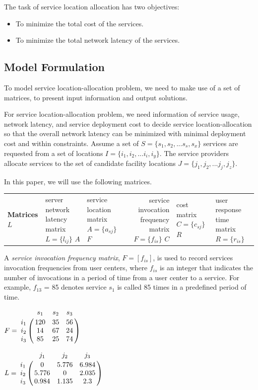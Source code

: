 \documentclass{llncs}
\let\bbordermatrix\bordermatrix
\begin{document}
The task of service location allocation has two objectives:
\begin{itemize}
	\item To minimize the total cost of the services.
	\item To minimize the total network latency of the services.
\end{itemize}


\subsection{Model Formulation}
\label{sec:model}
To model service location-allocation problem, we need to make use of a set of matrices, to present input information and output solutions. 

For service location-allocation problem, we need information of service usage, network latency, and service deployment cost to decide service location-allocation so that the overall network latency can be minimized with minimal deployment cost and within constraints.
Assume a set of $S = \{ s_{1}, s_{2}, ...s_{s}, s_{x}\}$ services are
requested from a set of locations $I = \{ i_{1}, i_{2}, ...i_{i}, i_{y} \}$. 
The service providers allocate services to the set of candidate facility locations $J = \{ j_{1}, j_{2}, ...j_{j}, j_{z} \}$.


In this paper, we will use the following matrices.
\begin{center}
{
	\begin{tabular}{l*{2}{l}r}
		\hline
		\textbf{Matrices} \cr
		$L$ & server network latency matrix $L = \{l_{ij}\}$ \cr
		$A$ & service location matrix $A = \{a_{sj}\}$ \cr
		$F$ & service invocation frequency matrix $F = \{f_{is}\}$ \cr
		$C$ & cost matrix $C = \{c_{sj}\}$ \cr
		$R$ & user response time matrix $R = \{r_{is}\}$ \cr
		\hline
	\end{tabular}
}
\end{center}
A \emph{service invocation frequency matrix}, $F= [f_{is}]$, is used to record services invocation frequencies from user centers, 
where $f_{is}$ is an integer that indicates the number of invocations in a period of time from a user center to a service. 
For example, $f_{13}$ = 85 denotes service $s_{1}$ is called 85 times in a predefined period of time.

\parbox{.45\linewidth}{
{\centering
$
F = \bbordermatrix{~ & s_{1} & s_{2} & s_{3}  \cr
					i_{1}	&120 &35 &56	\cr
					i_{2}	&14  &67 &24 \cr
					i_{3}	&85 &25 &74 \cr}
$
\\}
}
\parbox{.45\linewidth}{
{\centering
$
L = \bbordermatrix{~ & j_{1} & j_{2} & j_{3} \cr
					i_{1}	&0 &5.776 &6.984	\cr
					i_{2}	&5.776  &0 &2.035 \cr
					i_{3}	&0.984 &1.135	&2.3 \cr}
$
\\}
}
\end{document}
